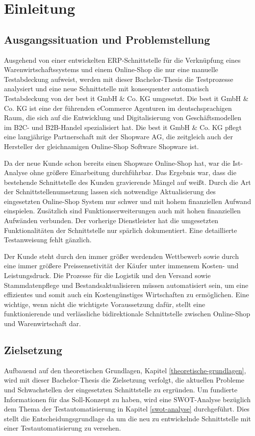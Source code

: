\section{Einleitung}
\subsection{Ausgangssituation und Problemstellung}
Ausgehend von einer entwickelten ERP-Schnittstelle für die Verknüpfung eines Warenwirtschaftssystems und einem Online-Shop die nur eine manuelle Testabdeckung aufweist, werden mit dieser Bachelor-Thesis die Testprozesse analysiert und eine neue Schnittstelle mit konsequenter automatisch Testabdeckung von der best it GmbH \& Co. KG umgesetzt. Die best it GmbH \& Co. KG ist eine der führenden eCommerce Agenturen im deutschsprachigen Raum, die sich auf die Entwicklung und Digitalisierung von Geschäftsmodellen im B2C- und B2B-Handel spezialisiert hat. Die best it GmbH \& Co. KG pflegt eine langjährige Partnerschaft mit der Shopware AG, die zeitgleich auch der Hersteller der gleichnamigen Online-Shop Software Shopware ist. 

Da der neue Kunde schon bereits einen Shopware Online-Shop hat, war die Ist-Analyse ohne größere Einarbeitung durchführbar. Das Ergebnis war, dass die bestehende Schnittstelle des Kunden gravierende Mängel auf weißt. Durch die Art der Schnittstellenumsetzung lassen sich notwendige Aktualisierung des eingesetzten Online-Shop System nur schwer und mit hohem finanziellen Aufwand einspielen. Zusätzlich sind Funktionserweiterungen auch mit hohen finanziellen Aufwänden verbunden. Der vorherige Dienstleister hat die umgesetzten Funktionalitäten der Schnittstelle nur spärlich dokumentiert. Eine detaillierte Testanweisung fehlt gänzlich. 

Der Kunde steht durch den immer größer werdenden Wettbewerb sowie durch eine immer größere Preissensetivität der Käufer unter immensem Kosten- und Leistungsdruck. Die Prozesse für die Logistik und den Versand sowie Stammdatenpflege und Bestandsaktualisieren müssen automatisiert sein, um eine effizientes und somit auch ein Kostengünstiges Wirtschaften zu ermöglichen. Eine wichtige, wenn nicht die wichtigste Voraussetzung dafür, stellt eine funktionierende und verlässliche bidirektionale Schnittstelle zwischen Online-Shop und Warenwirtschaft dar.

\subsection{Zielsetzung}
Aufbauend auf den theoretischen Grundlagen, Kapitel \ref{theoretische-grundlagen}, wird mit dieser Bachelor-Thesis die Zielsetzung verfolgt, die aktuellen Probleme und Schwachstellen der eingesetzten Schnittstelle zu ergründen. Um fundierte Informationen für das Soll-Konzept zu haben, wird eine SWOT-Analyse bezüglich dem Thema der Testautomatisierung in Kapitel \ref{swot-analyse} durchgeführt. Dies stellt die Entscheidungsgrundlage da um die neu zu entwickelnde Schnittstelle mit einer Testautomatisierung zu versehen. 

